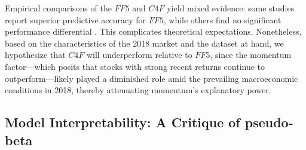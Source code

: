 Empirical comparisons of the $FF5$ and $C4F$ yield mixed evidence: some studies report superior predictive accuracy for $FF5$, while others find no significant performance differential \cite{cooper_2017,hou_2016}. This complicates theoretical expectations. Nonetheless, based on the characteristics of the 2018 market and the dataset at hand, we hypothesize that $C4F$ will underperform relative to $FF5$, since the momentum factor—which posits that stocks with strong recent returns continue to outperform—likely played a diminished role amid the prevailing macroeconomic conditions in 2018, thereby attenuating momentum's explanatory power.

\subsection{Model Interpretability: A Critique of pseudo-beta}





